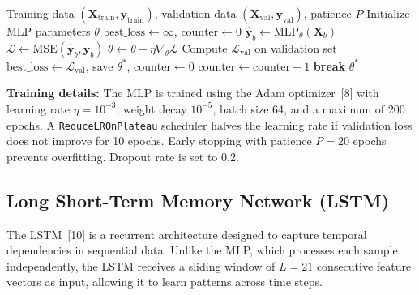 \documentclass{article}
\begin{document}
\begin{algorithm}[!t]
\caption{MLP Training with Early Stopping}
\label{alg:mlp}
\begin{algorithmic}[1]
\REQUIRE Training data $(\mathbf{X}_{\text{train}}, \mathbf{y}_{\text{train}})$, validation data $(\mathbf{X}_{\text{val}}, \mathbf{y}_{\text{val}})$, patience $P$
\STATE Initialize MLP parameters $\theta$
\STATE $\text{best\_loss} \leftarrow \infty$, $\text{counter} \leftarrow 0$
    \STATE $\hat{\mathbf{y}}_b \leftarrow \text{MLP}_\theta(\mathbf{X}_b)$
    \STATE $\mathcal{L} \leftarrow \text{MSE}(\hat{\mathbf{y}}_b, \mathbf{y}_b)$
    \STATE $\theta \leftarrow \theta - \eta \nabla_\theta \mathcal{L}$ 
  \ENDFOR
  \STATE Compute $\mathcal{L}_{\text{val}}$ on validation set
    \STATE $\text{best\_loss} \leftarrow \mathcal{L}_{\text{val}}$, save $\theta^*$, $\text{counter} \leftarrow 0$
  \ELSE
    \STATE $\text{counter} \leftarrow \text{counter} + 1$
  \ENDIF
    \STATE \textbf{break} 
  \ENDIF
\ENDFOR
\RETURN $\theta^*$
\end{algorithmic}
\end{algorithm}

\textbf{Training details:} The MLP is trained using the Adam optimizer~[8] with learning rate $\eta = 10^{-3}$, weight decay $10^{-5}$, batch size 64, and a maximum of 200 epochs. A \texttt{ReduceLROnPlateau} scheduler halves the learning rate if validation loss does not improve for 10 epochs. Early stopping with patience $P = 20$ epochs prevents overfitting. Dropout rate is set to 0.2.

\subsection{Long Short-Term Memory Network (LSTM)}

The LSTM~[10] is a recurrent architecture designed to capture temporal dependencies in sequential data. Unlike the MLP, which processes each sample independently, the LSTM receives a sliding window of $L = 21$ consecutive feature vectors as input, allowing it to learn patterns across time steps.
\end{document}

